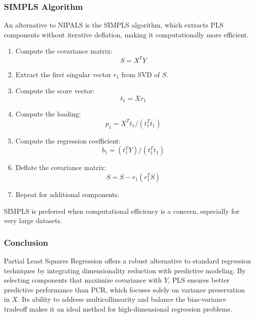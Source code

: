 \documentclass[11pt,twoside,a4paper]{article}
\begin{document}
\subsubsection{SIMPLS Algorithm}
An alternative to NIPALS is the SIMPLS algorithm, which extracts PLS components without iterative deflation, making it computationally more efficient.

\begin{enumerate}
    \item Compute the covariance matrix:
        \begin{equation}
        S = X^T Y
        \end{equation}
    \item Extract the first singular vector \( r_1 \) from SVD of \( S \).
    \item Compute the score vector:
        \begin{equation}
        t_1 = Xr_1
        \end{equation}
    \item Compute the loading:
        \begin{equation}
        p_1 = X^T t_1 / (t_1^T t_1)
        \end{equation}
    \item Compute the regression coefficient:
        \begin{equation}
        b_1 = (t_1^T Y) / (t_1^T t_1)
        \end{equation}
    \item Deflate the covariance matrix:
        \begin{equation}
        S = S - r_1 (r_1^T S)
        \end{equation}
    \item Repeat for additional components.
\end{enumerate}

SIMPLS is preferred when computational efficiency is a concern, especially for very large datasets.


\subsubsection{Conclusion}
Partial Least Squares Regression offers a robust alternative to standard regression techniques by integrating dimensionality reduction with predictive modeling. By selecting components that maximize covariance with \( Y \), PLS ensures better predictive performance than PCR, which focuses solely on variance preservation in \( X \). Its ability to address multicollinearity and balance the bias-variance tradeoff makes it an ideal method for high-dimensional regression problems. 
\end{document}
